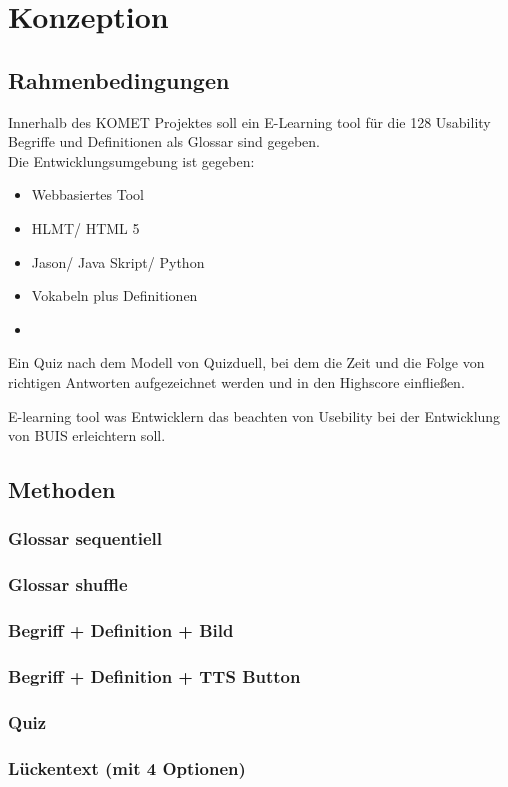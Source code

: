 \documentclass[a4paper, 12pt, twoside, BCOR=20mm, DIV=calc, abstracton, parskip=half*, toc=bibliography, toc=listof, headsepline, headings=small, numbers=enddot]{scrreprt} %
\begin{document}
\chapter{Konzeption}
\section{Rahmenbedingungen}
Innerhalb des KOMET Projektes soll ein E-Learning tool für die 128 Usability Begriffe und Definitionen als Glossar sind gegeben. \\Die Entwicklungsumgebung ist gegeben:
\begin{itemize}
\item{Webbasiertes Tool}
\item{HLMT/ HTML 5}
\item{Jason/ Java Skript/ Python}
\item{Vokabeln plus Definitionen}
\item  
\end{itemize}

Ein Quiz nach dem Modell von Quizduell, bei dem die Zeit und die Folge von richtigen Antworten aufgezeichnet werden und in den Highscore einfließen.

E-learning tool was Entwicklern das beachten von Usebility bei der Entwicklung von BUIS erleichtern soll.  

\section{Methoden}
\subsection{Glossar sequentiell}
\subsection{Glossar shuffle}
\subsection{Begriff + Definition + Bild}
\subsection{Begriff + Definition + TTS Button}
\subsection{Quiz}
\subsection{Lückentext (mit 4 Optionen)}
\end{document}
